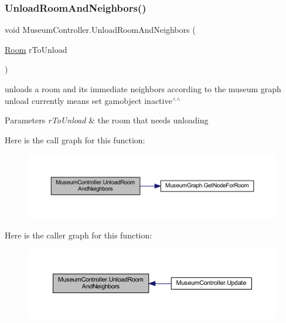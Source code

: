 \subsubsection{\texorpdfstring{Unload\+Room\+And\+Neighbors()}{UnloadRoomAndNeighbors()}}
{\footnotesize\ttfamily void Museum\+Controller.\+Unload\+Room\+And\+Neighbors (\begin{DoxyParamCaption}\item[{\mbox{\hyperlink{class_room}{Room}}}]{r\+To\+Unload }\end{DoxyParamCaption})\hspace{0.3cm}{\ttfamily [private]}}



unloads a room and it\textquotesingle{}s immediate neighbors according to the museum graph unload currently means set gamobject inactive$^\wedge$$^\wedge$ 


\begin{DoxyParams}{Parameters}
{\em r\+To\+Unload} & the room that needs unloading\\
\hline
\end{DoxyParams}
Here is the call graph for this function\+:
\nopagebreak
\begin{figure}[H]
\begin{center}
\leavevmode
\includegraphics[width=350pt]{class_museum_controller_aa65b2ea9f99d62431282233f0582fc4a_cgraph}
\end{center}
\end{figure}
Here is the caller graph for this function\+:
\nopagebreak
\begin{figure}[H]
\begin{center}
\leavevmode
\includegraphics[width=350pt]{class_museum_controller_aa65b2ea9f99d62431282233f0582fc4a_icgraph}
\end{center}
\end{figure}
\mbox{\label{class_museum_controller_adfeaf699686c1a1aad33bd585db636b9}} 
